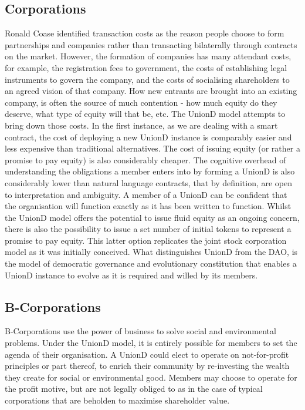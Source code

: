 \documentclass[12pt,twocolumn]{article}
\begin{document}
\subsection{Corporations}

Ronald Coase identified transaction costs as the reason people choose to form partnerships and companies rather than transacting bilaterally through contracts on the market. However, the formation of companies has many attendant costs, for example, the registration fees to government, the costs of establishing legal instruments to govern the company, and the costs of socialising shareholders to an agreed vision of that company. How new entrants are brought into an existing company, is often the source of much contention - how much equity do they deserve, what type of equity will that be, etc. The UnionD model attempts to bring down those costs. In the first instance, as we are dealing with a smart contract, the cost of deploying a new UnionD instance is comparably easier and less expensive than traditional alternatives. The cost of issuing equity (or rather a promise to pay equity) is also considerably cheaper. The cognitive overhead of understanding the obligations a member enters into by forming a UnionD is also considerably lower than natural language contracts, that by definition, are open to interpretation and ambiguity. A member of a UnionD can be confident that the organisation will function exactly as it has been written to function. Whilst the UnionD model offers the potential to issue fluid equity as an ongoing concern, there is also the possibility to issue a set number of initial tokens to represent a promise to pay equity. This latter option replicates the joint stock corporation model as it was initially conceived. What distinguishes UnionD from the DAO, is the model of democratic governance and evolutionary constitution that enables a UnionD instance to evolve as it is required and willed by its members.

\subsection{B-Corporations}

B-Corporations use the power of business to solve social and environmental problems. Under the UnionD model, it is entirely possible for members to set the agenda of their organisation. A UnionD could elect to operate on not-for-profit principles or part thereof, to enrich their community by re-investing the wealth they create for social or environmental good. Members may choose to operate for the profit motive, but are not legally obliged to as in the case of typical corporations that are beholden to maximise shareholder value.
\end{document}
